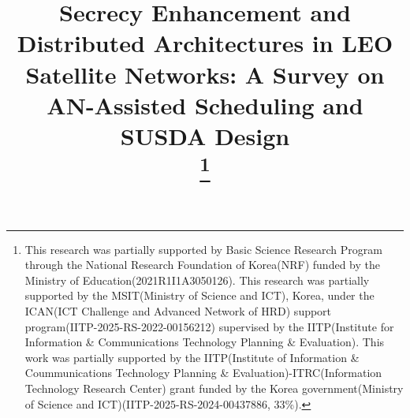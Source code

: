 \documentclass[conference]{IEEEtran}
\begin{document}
\title{Secrecy Enhancement and Distributed Architectures in LEO Satellite Networks: A Survey on AN-Assisted Scheduling and SUSDA Design\\
\thanks{This research was partially supported by Basic Science Research Program through the National Research Foundation of Korea(NRF) funded by the Ministry of Education(2021R1I1A3050126).
This research was partially supported by the MSIT(Ministry of Science and ICT), Korea, under the ICAN(ICT Challenge and Advanced Network of HRD) support program(IITP-2025-RS-2022-00156212) supervised by the IITP(Institute for Information \& Communications Technology Planning \& Evaluation).
This work was partially supported by the IITP(Institute of Information \& Coummunications Technology Planning \& Evaluation)-ITRC(Information Technology Research Center) grant funded by the Korea government(Ministry of Science and ICT)(IITP-2025-RS-2024-00437886, 33\%).}
}

\author{
\and
{}
\and
{}
}

\maketitle
\end{document}

